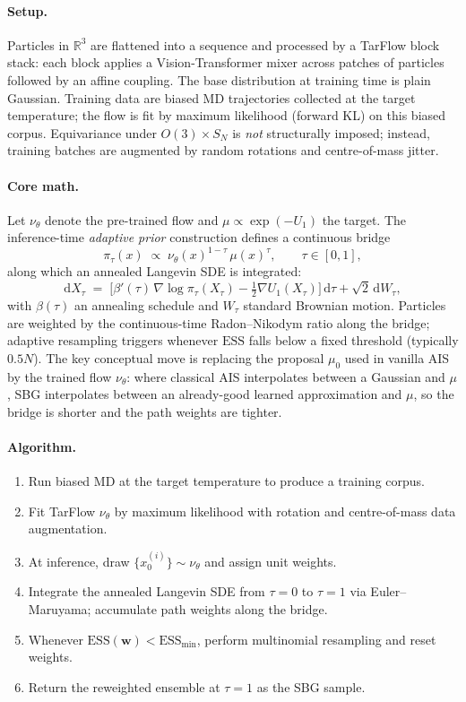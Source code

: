 \documentclass[11pt,letterpaper]{article}
\newcommand{\Real}{\mathbb{R}}
\newcommand{\ESS}{\mathrm{ESS}}
\newcommand{\dd}{\mathrm{d}}
\theoremstyle{plain}
\begin{document}
\paragraph{Setup.} Particles in $\Real^3$ are flattened into a sequence and
processed by a TarFlow block stack: each block applies a Vision-Transformer
mixer across patches of particles followed by an affine coupling. The base
distribution at training time is plain Gaussian. Training data are biased MD
trajectories collected at the target temperature; the flow is fit by maximum
likelihood (forward KL) on this biased corpus. Equivariance under
$O(3)\times S_N$ is \emph{not} structurally imposed; instead, training
batches are augmented by random rotations and centre-of-mass jitter.

\paragraph{Core math.} Let $\nu_\theta$ denote the pre-trained flow and
$\mu\propto\exp(-U_1)$ the target. The inference-time \emph{adaptive prior}
construction defines a continuous bridge
\[
  \pi_\tau(x) \;\propto\; \nu_\theta(x)^{1-\tau}\,\mu(x)^{\tau},
  \qquad \tau\in[0,1],
\]
along which an annealed Langevin SDE is integrated:
\[
  \dd X_\tau \;=\; \Big[\beta'(\tau)\,\nabla\log\pi_\tau(X_\tau)
      - \tfrac{1}{2}\nabla U_1(X_\tau)\Big]\,\dd\tau
      + \sqrt{2}\,\dd W_\tau,
\]
with $\beta(\tau)$ an annealing schedule and $W_\tau$ standard Brownian motion.
Particles are weighted by the continuous-time Radon--Nikodym ratio along the
bridge; adaptive resampling triggers whenever $\ESS$ falls below a fixed
threshold (typically $0.5N$). The key conceptual move is replacing the
proposal $\mu_0$ used in vanilla AIS by the trained flow $\nu_\theta$: where
classical AIS interpolates between a Gaussian and $\mu$, SBG interpolates
between an already-good learned approximation and $\mu$, so the bridge is
shorter and the path weights are tighter.

\paragraph{Algorithm.}
\begin{enumerate}\setlength{\itemsep}{1pt}
  \item Run biased MD at the target temperature to produce a training corpus.
  \item Fit TarFlow $\nu_\theta$ by maximum likelihood with rotation and
    centre-of-mass data augmentation.
  \item At inference, draw $\{x_0^{(i)}\}\sim\nu_\theta$ and assign unit weights.
  \item Integrate the annealed Langevin SDE from $\tau=0$ to $\tau=1$ via
    Euler--Maruyama; accumulate path weights along the bridge.
  \item Whenever $\ESS(\mathbf w)<\ESS_{\min}$, perform multinomial
    resampling and reset weights.
  \item Return the reweighted ensemble at $\tau=1$ as the SBG sample.
\end{enumerate}
\end{document}
